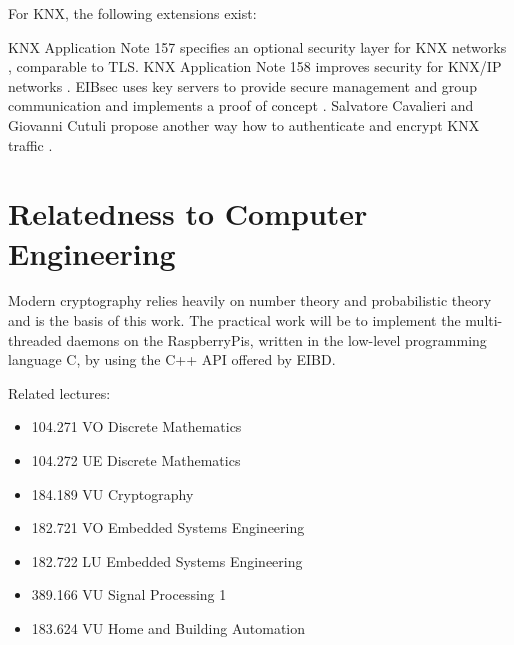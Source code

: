 \documentclass[a4paper,11pt,oneside]{memoir}
\begin{document}
For KNX, the following extensions exist:

KNX Application Note 157 specifies an optional security layer for KNX networks \cite{knx_data_sec}, comparable to TLS.
KNX Application Note 158 improves security for KNX/IP networks \cite{knx_ip_sec}.
EIBsec uses key servers to provide secure management and group communication and implements a proof of
concept \cite{KraInnosec2013}. Salvatore Cavalieri and Giovanni Cutuli propose another way how to authenticate and encrypt KNX traffic \cite{knxsec}.

\section{Relatedness to Computer Engineering}

Modern cryptography relies heavily on number theory and probabilistic theory and is the basis of this work.
The practical work will be to implement the multi-threaded daemons on the RaspberryPis, written in the low-level programming language
C, by using the C++ API offered by EIBD.

Related lectures:

\begin{itemize}
 \item 104.271 VO Discrete Mathematics 
 \item 104.272 UE Discrete Mathematics 
 \item 184.189 VU Cryptography 
 \item 182.721 VO Embedded Systems Engineering 
 \item 182.722 LU Embedded Systems Engineering 
 \item 389.166 VU Signal Processing 1
 \item 183.624 VU Home and Building Automation 

\end{itemize}

\printbibliography
\end{document}

